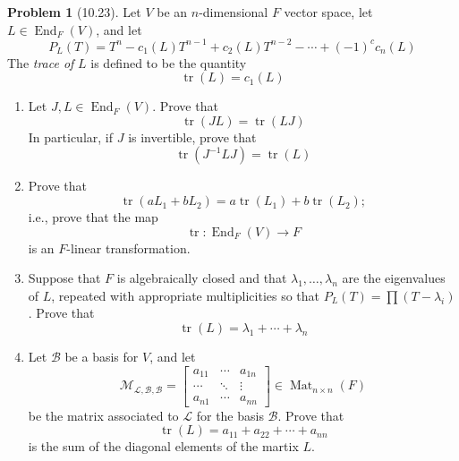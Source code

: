 \documentclass[12pt]{article}
\theoremstyle{definition}
\newtheorem{problem}{Problem}
\DeclareMathOperator{\tr}{tr}
\DeclareMathOperator{\End}{End}
\DeclareMathOperator{\Mat}{Mat}
\begin{document}
\begin{problem}[10.23]
    Let $V$ be an $n$-dimensional $F$ vector space, let $L \in \End_F(V)$, and let
    \[
        P_L(T) = T^n - c_1(L)T^{n-1} + c_2(L)T^{n-2} - \cdots + (-1)^{c}c_n(L)
    \]
    The \textit{trace of} $L$ is defined to be the quantity
    \[
        \tr(L) = c_1(L)
    \]
    \begin{enumerate}[label=(\alph*)]
        \item Let $J, L \in \End_F(V)$. Prove that
        \[
            \tr(JL) = \tr(LJ)
        \]
        In particular, if $J$ is invertible, prove that
        \[
            \tr(J^{-1}LJ) = \tr(L)
        \]
        \begin{solution}

        \end{solution}

        \item Prove that
        \[
            \tr(aL_1 + bL_2) = a\tr(L_1) + b\tr(L_2);
        \]
        i.e., prove that the map
        \[
            \tr : \End_F(V) \longrightarrow F
        \]
        is an $F$-linear transformation.
        \begin{solution}

        \end{solution}

        \item Suppose that $F$ is algebraically closed and that $\lambda_1, \ldots, \lambda_n$ are the eigenvalues of $L$, 
        repeated with appropriate multiplicities so that $P_L(T) = \prod(T - \lambda_i)$. Prove that
        \[
            \tr(L) = \lambda_1 + \cdots + \lambda_n
        \]
        \begin{solution}

        \end{solution}

        \item Let $\mathcal{B}$ be a basis for $V$, and let
        \begin{equation}
            \mathcal{M}_{\mathcal{L}, \mathcal{B}, \mathcal{B}} = 
            \begin{bmatrix}
                a_{11} & \cdots & a_{1n}\\ 
                \cdots & \ddots & \vdots\\   
                a_{n1}& \cdots & a_{nn}
            \end{bmatrix}
            \in \Mat_{n \times n}(F)
        \end{equation}
        be the matrix associated to $\mathcal{L}$ for the basis $\mathcal{B}$. Prove that
        \[
            \tr(L) = a_{11} + a_{22} + \cdots + a_{nn}
        \]
        is the sum of the diagonal elements of the martix $L$.
        \begin{solution}

        \end{solution}
    \end{enumerate}
\end{problem}
\end{document}
